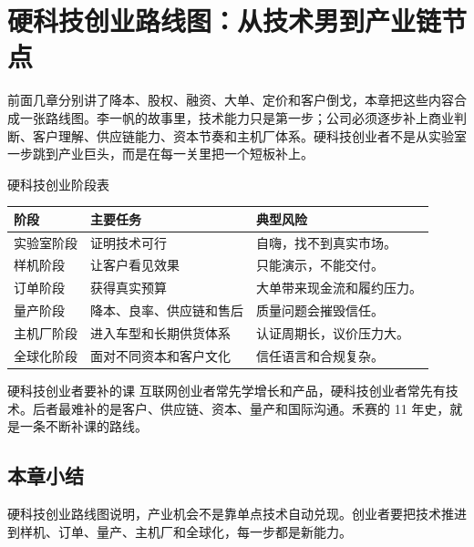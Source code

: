 \section{硬科技创业路线图：从技术男到产业链节点}

前面几章分别讲了降本、股权、融资、大单、定价和客户倒戈，本章把这些内容合成一张路线图。李一帆的故事里，技术能力只是第一步；公司必须逐步补上商业判断、客户理解、供应链能力、资本节奏和主机厂体系。硬科技创业者不是从实验室一步跳到产业巨头，而是在每一关里把一个短板补上。

\begin{knowledgebox}{硬科技创业阶段表}
\begin{tabularx}{\textwidth}{p{}p{}X}
\toprule
阶段 & 主要任务 & 典型风险 \\
\midrule
实验室阶段 & 证明技术可行 & 自嗨，找不到真实市场。 \\
样机阶段 & 让客户看见效果 & 只能演示，不能交付。 \\
订单阶段 & 获得真实预算 & 大单带来现金流和履约压力。 \\
量产阶段 & 降本、良率、供应链和售后 & 质量问题会摧毁信任。 \\
主机厂阶段 & 进入车型和长期供货体系 & 认证周期长，议价压力大。 \\
全球化阶段 & 面对不同资本和客户文化 & 信任语言和合规复杂。 \\
\bottomrule
\end{tabularx}
\end{knowledgebox}

\begin{importantbox}{硬科技创业者要补的课}
互联网创业者常先学增长和产品，硬科技创业者常先有技术。后者最难补的是客户、供应链、资本、量产和国际沟通。禾赛的 11 年史，就是一条不断补课的路线。
\end{importantbox}

\subsection{本章小结}

硬科技创业路线图说明，产业机会不是靠单点技术自动兑现。创业者要把技术推进到样机、订单、量产、主机厂和全球化，每一步都是新能力。


